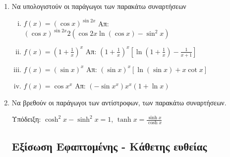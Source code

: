 \documentclass[a4paper,table]{report}
\begin{document}
\begin{enumerate}
  \item  Να υπολογιστούν οι παράγωγοι των παρακάτω συναρτήσεων

    \begin{enumerate}[(i)]
      \item $ f(x) = (\cos{x})^{\sin{2x}} $ \hfill Απ: $
        (\cos{x})^{\sin{2x}} 2(\cos{2x} \ln{(\cos{x})} - \sin^{2}{x}) $
      \item $ f(x) = \left(1 + \frac{1}{x} \right)^{x} $ \hfill Απ: $
        \left(1 + \frac{1}{x}\right)^{x}\left[\ln{(1 + \frac{1}{x})} -
        \frac{1}{x+1}\right] $
      \item $ f(x)=(\sin{x})^{x} $ \hfill Απ: $ (\sin{x})^{x}[\ln{(\sin{x}
        )} + x \cot{x}] $ 
      \item $ f(x)=\cos{x}^{x} $ \hfill Απ: $ (- \sin{x^{x}})x^{x} (1 +
        \ln{x}) $
    \end{enumerate}



  \item Να βρεθούν οι παράγωγοι των αντίστροφων, των παρακάτω συναρτήσεων.

    \textcolor{Col1}{Υπόδειξη:} 
      $ \cosh^{2}{x} - \sinh^{2}{x} = 1 $, \;
      $ \tanh{x} = \frac{\sinh{x}}{\cosh{x}} $ 
    \begin{enumerate}[(i)]
    \end{enumerate}

      \subsection*{Εξίσωση Εφαπτομένης - Κάθετης ευθείας}


\end{enumerate}
\end{document}

